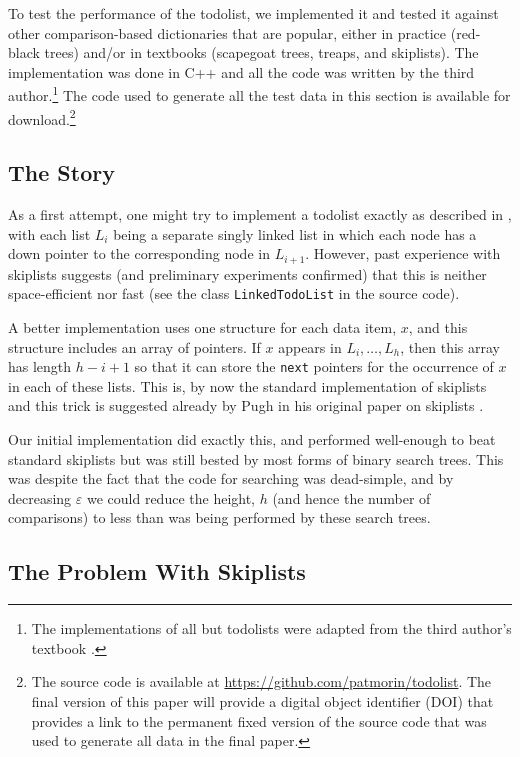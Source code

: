 \documentclass[12pt]{patmorin}
\newcommand{\eps}{\varepsilon}
\begin{document}
To test the performance of the todolist, we implemented it and tested
it against other comparison-based dictionaries that are popular, either
in practice (red-black trees) and/or in textbooks (scapegoat trees,
treaps, and skiplists).  The implementation was done in C++ and all
the code was written by the third author.\footnote{The implementations of all
but todolists were adapted from the third author's textbook \cite{morin:open}.}
The code used to generate all the test data in this section is available
for download.\footnote{The source code is available at \url{https://github.com/patmorin/todolist}. The final version of this paper
will provide a digital object identifier (DOI) that provides a link to
the permanent fixed version of the source code that was used to generate
all data in the final paper.}

\subsection{The Story}

As a first attempt, one might try to implement a todolist exactly
as described in , with each list $L_i$ being a
separate singly linked list in which each node has a down pointer to
the corresponding node in $L_{i+1}$.  However, past experience with
skiplists suggests (and preliminary experiments confirmed) that this is
neither space-efficient nor fast (see the class \texttt{LinkedTodoList}
in the source code).

A better implementation uses one structure for each data item, $x$,
and this structure includes an array of pointers.  If $x$ appears in
$L_{i},\ldots,L_h$, then this array has length $h-i+1$ so that it can
store the \texttt{next} pointers for the occurrence of $x$ in each of
these lists.  This is, by now the standard implementation of skiplists
and this trick is suggested already by Pugh in his original paper on
skiplists \cite{pugh:skip}.

Our initial implementation did exactly this, and performed well-enough
to beat standard skiplists but was still bested by most forms of binary
search trees.  This was despite the fact that the code for searching was
dead-simple, and by decreasing $\eps$ we could reduce the height, $h$
(and hence the number of comparisons) to less than was being performed
by these search trees.

\subsection{The Problem With Skiplists}
\end{document}
